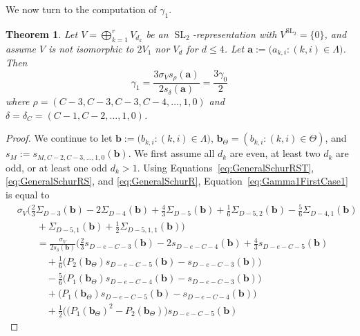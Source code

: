 \documentclass{amsart}
\newtheorem{theorem}{Theorem}[section]
\theoremstyle{definition}
\theoremstyle{remark}
\newcommand{\SL}{\operatorname{SL}}
\newcommand{\bs}{\boldsymbol}
\begin{document}
We now turn to the computation of $\gamma_1$.

\begin{theorem}
\label{thrm:Gamma1Schur}
Let $V = \bigoplus_{k=1}^r V_{d_k}$ be an $\SL_2$-representation with $V^{\SL_2} = \{0\}$,
and assume $V$ is not isomorphic to $2V_1$ nor $V_d$ for $d \leq 4$.
Let $\bs{a} := \big(a_{k,i} : (k,i)\in\Lambda\big)$. Then
\begin{equation}
\label{eq:Gamma1Schur}
    \gamma_1
    =
    \frac{3 \sigma_V s_{\rho}(\bs{a}) }{2 s_{\delta}(\bs{a}) }
    =
    \frac{3\gamma_0}{2}
\end{equation}
where $\rho = (C-3,C-3,C-3,C-4,\ldots,1,0)$ and $\delta = \delta_C =(C-1,C-2,\ldots,1,0)$.
\end{theorem}
\begin{proof}
We continue to let $\bs{b} := \big(b_{k,i} : (k,i)\in\Lambda\big)$,
$\bs{b}_\Theta = (b_{k,i} : (k,i)\in\Theta)$,
and $s_M := s_{M,C-2,C-3, \ldots, 1, 0}(\bs{b})$.
We first assume all $d_k$ are even, at least two $d_k$ are odd, or at least
one odd $d_k > 1$. Using Equations~\eqref{eq:GeneralSchurRST},
\eqref{eq:GeneralSchurRS}, and \eqref{eq:GeneralSchurR},
Equation~\eqref{eq:Gamma1FirstCase1} is equal to
\begin{align*}
    &\sigma_V\Big(
        \frac{2}{3} \Sigma_{D-3}(\bs{b}) - 2 \Sigma_{D-4}(\bs{b}) + \frac{4}{3} \Sigma_{D-5}(\bs{b})
            + \frac{1}{6}\Sigma_{D-5,2}(\bs{b}) - \frac{5}{6}\Sigma_{D-4,1}(\bs{b})
    \\&\quad\quad
            + \Sigma_{D-5,1}(\bs{b}) + \frac{1}{2}\Sigma_{D-5,1,1}(\bs{b}) \Big)
    \\&\quad\quad=
    \frac{\sigma_V}{ 2 s_{\delta}(\bs{b}) }\Big(
        \frac{2}{3} s_{D - e - C - 3}(\bs{b})
            - 2 s_{D - e - C - 4}(\bs{b})
            + \frac{4}{3} s_{D - e - C - 5}(\bs{b})
    \\&\quad\quad\quad
            + \frac{1}{6}\big(P_2(\bs{b}_\Theta) s_{D - e - C - 5}(\bs{b})
                - s_{D - e - C - 3}(\bs{b}) \big)
    \\&\quad\quad\quad
            - \frac{5}{6}\big(P_1(\bs{b}_\Theta) s_{D - e - C - 4}(\bs{b})
                - s_{D - e - C - 3}(\bs{b}) \big)
    \\&\quad\quad\quad
            + \big(P_1(\bs{b}_\Theta) s_{D - e - C - 5}(\bs{b})
                - s_{D - e - C - 4}(\bs{b}) \big)
    \\&\quad\quad\quad
            + \frac{1}{2}\Big( \big(P_1(\bs{b}_\Theta)^2 - P_{2} (\bs{b}_\Theta) \big)
                s_{D - e - C- 5}(\bs{b})

\end{align*}
\end{proof}
\end{document}
